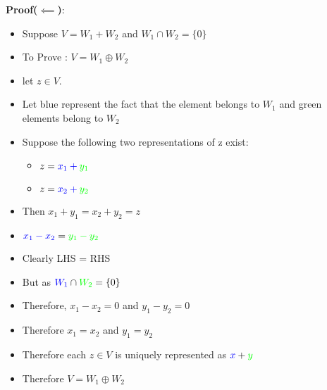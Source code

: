 \documentclass[twoside]{article}
\begin{document}
	{\bf Proof($\impliedby$)}:
	\begin{itemize}
		\item Suppose $V = W_1 + W_2$ and $W_1 \cap W_2 = \{0\}$ 
		\item To Prove : $V = W_1 \oplus W_2$
		\item let $z \in V$. 
		\item Let blue represent the fact that the element belongs to $W_1$ and green elements belong to $W_2$
		\item Suppose the following two representations of z exist:
		\begin{itemize}
			\item $z = {\color{blue}x_1 + \color{green}y_1}$ 
			\item $z = {\color{blue}x_2 + \color{green}y_2}$
		\end{itemize}
		\item Then $x_1 + y_1 = x_2 + y_2 = z$
		\item ${\color{blue}x_1 - x_2} = {\color{green}y_1 - y_2}$
		\item Clearly LHS = RHS
		\item But as ${\color{blue}W_1} \cap {\color{green}W_2} = \{0\}$
		\item Therefore, $x_1 - x_2 = 0$ and $y_1 - y_2 = 0$
		\item Therefore $x_1 = x_2$ and $y_1 = y_2$
		\item Therefore each $z \in V$ is uniquely represented as ${\color{blue}x} + {\color{green}y}$
		\item Therefore $V = W_1 \oplus W_2$
	\end{itemize}
\end{document}

